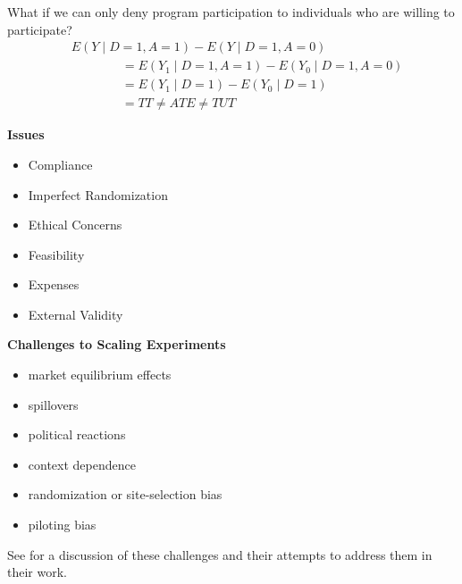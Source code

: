 \begin{frame}
What if we can only deny program participation to individuals who are willing to participate?
\begin{align*}
& E(Y\mid D= 1, A = 1) - E(Y\mid D = 1, A = 0) \\
& \qquad\qquad = E(Y_1\mid D= 1, A = 1) - E(Y_0\mid D=1, A = 0) \\
& \qquad\qquad = E(Y_1\mid D = 1) - E(Y_0 \mid D = 1)  \\
& \qquad\qquad = TT \neq ATE \neq TUT
\end{align*}
\end{frame}
\begin{frame}\textbf{Issues}\vspace{0.3cm}

\begin{itemize}\setlength\itemsep{1em}
\item Compliance
\item Imperfect Randomization
\item Ethical Concerns
\item Feasibility
\item Expenses
\item External Validity
\end{itemize}
\end{frame}
\begin{frame}\textbf{Challenges to Scaling Experiments}\vspace{0.3cm}

\begin{itemize}\setlength\itemsep{1em}
\item market equilibrium effects
\item spillovers
\item political reactions
\item context dependence
\item randomization or site-selection bias
\item piloting bias\vspace{0.3cm}
\end{itemize}

See  for a discussion of these challenges and their attempts to address them in their work.
\end{frame}

